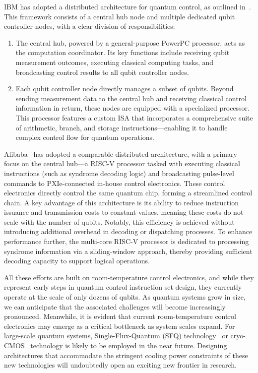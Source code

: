 \documentclass[a4paper,onecolumn,11pt,unpublished]{quantumarticle}
\begin{document}
IBM has adopted a distributed architecture for quantum control, as outlined in~\cite{zettles262DesignConsiderations2022}. This framework consists of a central hub node and multiple dedicated qubit controller nodes, with a clear division of responsibilities:
\begin{enumerate}
\item  The central hub, powered by a general-purpose PowerPC processor, acts as the computation coordinator. Its key functions include receiving qubit measurement outcomes, executing classical computing tasks, and broadcasting control results to all qubit controller nodes.
\item Each qubit controller node directly manages a subset of qubits. Beyond sending measurement data to the central hub and receiving classical control information in return, these nodes are equipped with a specialized processor. This processor features a custom ISA that incorporates a comprehensive suite of arithmetic, branch, and storage instructions---enabling it to handle complex control flow for quantum operations.
\end{enumerate}

Alibaba~\cite{zhangClassicalArchitectureDigital2024} has adopted a comparable distributed architecture, with a primary focus on the central hub---a RISC-V processor tasked with executing classical instructions (such as syndrome decoding logic) and broadcasting pulse-level commands to PXIe-connected in-house control electronics. These control electronics directly control the same quantum chip, forming a streamlined control chain. A key advantage of this architecture is its ability to reduce instruction issuance and transmission costs to constant values, meaning these costs do not scale with the number of qubits. Notably, this efficiency is achieved without introducing additional overhead in decoding or dispatching processes. To enhance performance further, the multi-core RISC-V processor is dedicated to processing syndrome information via a sliding-window approach, thereby providing sufficient decoding capacity to support logical operations.

All these efforts are built on room-temperature control electronics, and while they represent early steps in quantum control instruction set design, they currently operate at the scale of only dozens of qubits. As quantum systems grow in size, we can anticipate that the associated challenges will become increasingly pronounced. Meanwhile, it is evident that current room-temperature control electronics may emerge as a critical bottleneck as system scales expand. For large-scale quantum systems, Single-Flux-Quantum (SFQ) technology~\cite{mukhanov2011energy,mcdermott2018quantum} or cryo-CMOS~\cite{charbon2016cryo,patra2017cryo,sebastiano2017cryo} technology is likely to be employed in the near future. Designing architectures that accommodate the stringent cooling power constraints of these new technologies will undoubtedly open an exciting new frontier in research.
\end{document}

